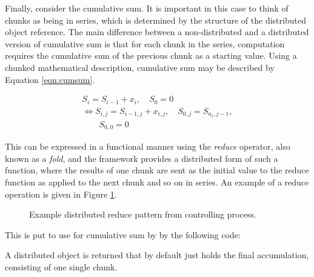 Finally, consider the cumulative sum.
It is important in this case to think of chunks as being in series, which is determined by the structure of the distributed object reference.
The main difference between a non-distributed and a distributed version of cumulative sum is that for each chunk in the series, computation requires the cumulative sum of the previous chunk as a starting value.
Using a chunked mathematical description, cumulative sum may be described by Equation \ref{eqn:cumsum}.

\begin{equation}
\begin{gathered}\label{eqn:cumsum}
    S_i = S_{i-1}+x_i, \quad S_0 = 0\\
    \iff S_{i,j} = S_{i-1,j} + x_{i,j}, \quad S_{0,j} = S_{n_i,j-1},\\
    \qquad S_{0,0} = 0
\end{gathered}
\end{equation}

This can be expressed in a functional manner using the \textit{reduce} operator, also known as a \textit{fold}, and the  framework provides a distributed form of such a function, where the results of one chunk are sent as the initial value to the reduce function as applied to the next chunk and so on in series.
An example of a reduce operation is given in Figure \ref{fig:dreduce}.

\begin{figure}[ht]
\begin{center}
    
\caption{Example distributed reduce pattern from controlling process.}
\label{fig:dreduce}
\end{center}
\end{figure}

This is put to use for cumulative sum by  by the following code:


A distributed object is returned that by default just holds the final accumulation, consisting of one single chunk.